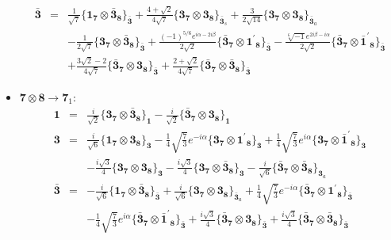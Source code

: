 \documentclass[english]{article}
\newcommand{\subcg}[3]{\big\{ {#1}\otimes{#2}\big\}^{}_{#3}}
\newcommand{\rep}[1]{\mathbf{#1}}
\begin{document}
\begin{itemize}
\begin{eqnarray*}
\\
\rep{\bar{3}} &=& \frac{1}{\sqrt{7}}\subcg{\rep{1}_{\rep{7}}}{\rep{\bar{3}}_{\rep{8}}}{\rep{\bar{3}}}+\frac{4+\sqrt{2}}{4 \sqrt{7}}\subcg{\rep{3}_{\rep{7}}}{\rep{3}_{\rep{8}}}{\rep{\bar{3}}_{s}}+\frac{3}{2 \sqrt{14}}\subcg{\rep{3}_{\rep{7}}}{\rep{3}_{\rep{8}}}{\rep{\bar{3}}_{a}} \\ 
 & & -\frac{1}{2 \sqrt{7}}\subcg{\rep{3}_{\rep{7}}}{\rep{\bar{3}}_{\rep{8}}}{\rep{\bar{3}}}+\frac{(-1)^{5/6} e^{i \alpha -2 i \beta }}{2 \sqrt{2}}\subcg{\rep{\bar{3}}_{\rep{7}}}{\rep{1^{\prime}}_{\rep{8}}}{\rep{\bar{3}}}-\frac{\sqrt[6]{-1} e^{2 i \beta -i \alpha }}{2 \sqrt{2}}\subcg{\rep{\bar{3}}_{\rep{7}}}{\rep{\bar{1}^{\prime}}_{\rep{8}}}{\rep{\bar{3}}} \\ 
 & & +\frac{3 \sqrt{2}-2}{4 \sqrt{7}}\subcg{\rep{\bar{3}}_{\rep{7}}}{\rep{3}_{\rep{8}}}{\rep{\bar{3}}}+\frac{2+\sqrt{2}}{4 \sqrt{7}}\subcg{\rep{\bar{3}}_{\rep{7}}}{\rep{\bar{3}}_{\rep{8}}}{\rep{\bar{3}}}
\end{eqnarray*}
\item $\rep{7}\otimes\rep{8}\to\rep{7}_{1}$:
\begin{eqnarray*}
\rep{1} &=& \frac{i}{\sqrt{2}}\subcg{\rep{3}_{\rep{7}}}{\rep{\bar{3}}_{\rep{8}}}{\rep{1}}-\frac{i}{\sqrt{2}}\subcg{\rep{\bar{3}}_{\rep{7}}}{\rep{3}_{\rep{8}}}{\rep{1}}
\\
\rep{3} &=& \frac{i}{\sqrt{6}}\subcg{\rep{1}_{\rep{7}}}{\rep{3}_{\rep{8}}}{\rep{3}}-\frac{1}{4} \sqrt{\frac{7}{3}} e^{-i \alpha }\subcg{\rep{3}_{\rep{7}}}{\rep{1^{\prime}}_{\rep{8}}}{\rep{3}}+\frac{1}{4} \sqrt{\frac{7}{3}} e^{i \alpha }\subcg{\rep{3}_{\rep{7}}}{\rep{\bar{1}^{\prime}}_{\rep{8}}}{\rep{3}} \\ 
 & & -\frac{i \sqrt{3}}{4}\subcg{\rep{3}_{\rep{7}}}{\rep{3}_{\rep{8}}}{\rep{3}}-\frac{i \sqrt{3}}{4}\subcg{\rep{3}_{\rep{7}}}{\rep{\bar{3}}_{\rep{8}}}{\rep{3}}-\frac{i}{\sqrt{6}}\subcg{\rep{\bar{3}}_{\rep{7}}}{\rep{\bar{3}}_{\rep{8}}}{\rep{3}_{a}}
\\
\rep{\bar{3}} &=& -\frac{i}{\sqrt{6}}\subcg{\rep{1}_{\rep{7}}}{\rep{\bar{3}}_{\rep{8}}}{\rep{\bar{3}}}+\frac{i}{\sqrt{6}}\subcg{\rep{3}_{\rep{7}}}{\rep{3}_{\rep{8}}}{\rep{\bar{3}}_{a}}+\frac{1}{4} \sqrt{\frac{7}{3}} e^{-i \alpha }\subcg{\rep{\bar{3}}_{\rep{7}}}{\rep{1^{\prime}}_{\rep{8}}}{\rep{\bar{3}}} \\ 
 & & -\frac{1}{4} \sqrt{\frac{7}{3}} e^{i \alpha }\subcg{\rep{\bar{3}}_{\rep{7}}}{\rep{\bar{1}^{\prime}}_{\rep{8}}}{\rep{\bar{3}}}+\frac{i \sqrt{3}}{4}\subcg{\rep{\bar{3}}_{\rep{7}}}{\rep{3}_{\rep{8}}}{\rep{\bar{3}}}+\frac{i \sqrt{3}}{4}\subcg{\rep{\bar{3}}_{\rep{7}}}{\rep{\bar{3}}_{\rep{8}}}{\rep{\bar{3}}}

\end{eqnarray*}
\end{itemize}
\end{document}
